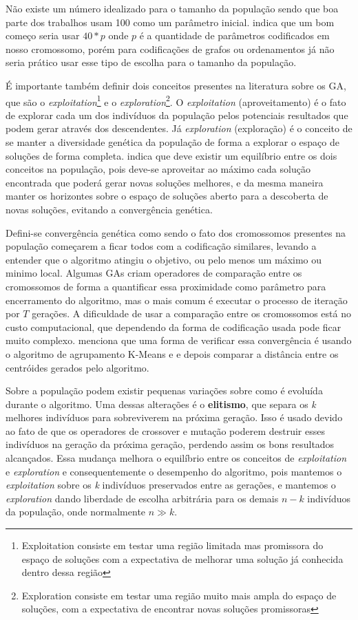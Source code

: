 Não existe um número idealizado para o tamanho da população sendo que boa parte dos trabalhos usam 100 como um parâmetro inicial. \citeauthor{Linden2008} indica que um bom começo seria usar \(40 * p\) onde \(p\) é a quantidade de parâmetros codificados em nosso cromossomo, porém para codificações de grafos ou ordenamentos já não seria prático usar esse tipo de escolha para o tamanho da população.

É importante também definir dois conceitos presentes na literatura sobre os GA, que são o \textit{exploitation}\footnote{Exploitation consiste em testar uma região limitada mas promissora do espaço de soluções com a expectativa de melhorar uma solução já conhecida dentro dessa região} e o \textit{exploration}\footnote{Exploration consiste em testar uma região muito mais ampla do espaço de soluções, com a expectativa de encontrar novas soluções promissoras}. O \textit{exploitation} (aproveitamento) é o fato de explorar cada um dos indivíduos da população pelos potenciais resultados que podem gerar através dos descendentes. Já \textit{exploration} (exploração) é o conceito de se manter a diversidade genética da população de forma a explorar o espaço de soluções de forma completa. \citeauthor{Holland1992} indica que deve existir um equilíbrio entre os dois conceitos na população, pois deve-se aproveitar ao máximo cada solução encontrada que poderá gerar novas soluções melhores, e da mesma maneira manter os horizontes sobre o espaço de soluções aberto para a descoberta de novas soluções, evitando a convergência genética.

Defini-se convergência genética como sendo o fato dos cromossomos presentes na população começarem a ficar todos com a codificação similares, levando a entender que o algoritmo atingiu o objetivo, ou pelo menos um máximo ou minimo local. Algumas GAs criam operadores de comparação entre os cromossomos de forma a quantificar essa proximidade como parâmetro para encerramento do algoritmo, mas o mais comum é executar o processo de iteração por \(T\) gerações. A dificuldade de usar a comparação entre os cromossomos está no custo computacional, que dependendo da forma de codificação usada pode ficar muito complexo. \citeauthor{Linden2008} menciona que uma forma de verificar essa convergência é usando o algoritmo de agrupamento K-Means e e depois comparar a distância entre os centróides gerados pelo algoritmo.

Sobre a população podem existir pequenas variações sobre como é evoluída durante o algoritmo. Uma dessas alterações é o \textbf{elitismo}, que separa os \textit{k} melhores indivíduos para sobreviverem na próxima geração. Isso é usado devido ao fato de que os operadores de crossover e mutação poderem destruir esses indivíduos na geração da próxima geração, perdendo assim os bons resultados alcançados. Essa mudança melhora o equilíbrio entre os conceitos de \textit{exploitation} e \textit{exploration} e consequentemente o desempenho do algoritmo, pois mantemos o \textit{exploitation} sobre os \textit{k} indivíduos preservados entre as gerações, e mantemos o \textit{exploration} dando liberdade de escolha arbitrária para os demais \(n-k\) indivíduos da população, onde normalmente \(n \gg k\). 

